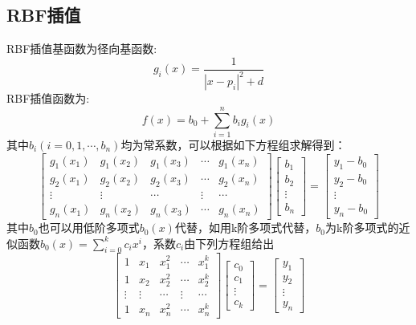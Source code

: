 \documentclass{article}
\begin{document}
\subsection{RBF插值}
	RBF插值基函数为径向基函数:
$$g_{i}(x)=\frac{1}{|x-p_{i}|^2+d}$$
RBF插值函数为:
	$$f(x)=b_0+\sum_{i=1}^{n}b_{i}g_{i}(x)$$
	其中$b_i(i=0,1,\cdots,b_n)$均为常系数，可以根据如下方程组求解得到：
	\begin{equation}
		\left[
		\begin{array}{ccccc}
			g_1(x_1)      & g_1(x_2)    & g_1(x_3) & \cdots&g_1(x_n)\\
			g_2(x_1)      & g_2(x_2)    &g_2(x_3) & \cdots&g_2(x_n)\\
			\vdots & \vdots & \cdots& \vdots&\cdots\\
			g_n(x_1)      & g_n(x_2)    & g_n(x_3) & \cdots&g_n(x_n)
		\end{array}
		\right]
		\left[
		\begin{array}{c}
			b_1     \\
			b_2     \\
			\vdots\\
			b_n     
		\end{array}
		\right]
		=
		\left[
		\begin{array}{c}
			y_1-b_0     \\
			y_2-b_0     \\
			\vdots\\
			y_n-b_0     
		\end{array}
		\right]
	\end{equation}
其中$b_0$也可以用低阶多项式$b_0(x)$代替，如用k阶多项式代替，$b_0$为k阶多项式的近似函数$b_0(x)=\sum_{i=0}^{k}c_ix^i$，系数$c_i$由下列方程组给出
\begin{equation}
	\left[
	\begin{array}{ccccc}
			1      & x_1    & x_1^2 & \cdots&x_1^k\\
		1      & x_2    & x_2^2 & \cdots&x_2^k\\
		\vdots & \vdots & \cdots& \vdots&\cdots\\
		1      & x_n    & x_n^2 & \cdots&x_n^k
	\end{array}
	\right]
	\left[
	\begin{array}{c}
		c_0     \\
		c_1     \\
		\vdots\\
		c_k     
	\end{array}
	\right]
	=
	\left[
	\begin{array}{c}
		y_1     \\
		y_2     \\
		\vdots\\
		y_n     
	\end{array}
	\right]
\end{equation}
\end{document}

